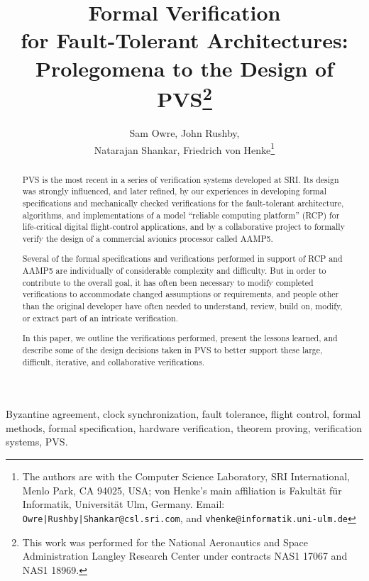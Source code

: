 \title{{\bf Formal Verification\\for Fault-Tolerant Architectures:\\
Prolegomena to the Design of PVS\thanks{This work was performed for
the National Aeronautics and Space Administration Langley Research
Center under contracts NAS1 17067 and NAS1
18969.}}}
\author{Sam Owre, John Rushby,\\Natarajan Shankar, Friedrich von
Henke\thanks{The authors are with the Computer Science Laboratory,
SRI International, Menlo Park, CA 94025, USA; von Henke's main
affiliation is Fakult\"{a}t f\"{u}r Informatik, Universit\"{a}t Ulm,
Germany.  Email: {\tt Owre|Rushby|Shankar@csl.sri.com}, and
{\tt vhenke@informatik.uni-ulm.de}}}
\maketitle
\begin{abstract}
PVS is the most recent in a series of verification systems developed
at SRI\@.  Its design was strongly influenced, and later refined, by
our experiences in developing formal specifications and mechanically
checked verifications for the fault-tolerant architecture,
algorithms, and implementations of a model ``reliable computing
platform'' (RCP) for life-critical digital flight-control
applications, and by a collaborative project to formally verify the
design of a commercial avionics processor called AAMP5.

Several of the formal specifications and verifications performed in
support of RCP and AAMP5 are individually of considerable complexity
and difficulty.  But in order to contribute to the overall goal, it
has often been necessary to modify completed verifications to
accommodate changed assumptions or requirements, and people other
than the original developer have often needed to understand, review,
build on, modify, or extract part of an intricate verification.

In this paper, we outline the verifications performed, present the
lessons learned, and describe some of the design decisions taken in
PVS to better support these large, difficult, iterative, and
collaborative verifications.

\end{abstract}

\begin{keywords}
Byzantine agreement, clock synchronization, fault tolerance, flight
control, formal methods, formal specification, hardware verification,
theorem proving, verification systems, PVS.
\end{keywords}

